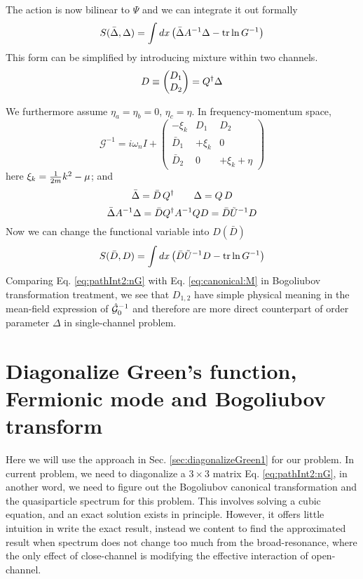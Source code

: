 The action is now bilinear to $\Psi$ and we can integrate it out formally
\begin{equation}
S(\bar\Delta,\Delta)=\int{dx}
	\left(\bar\Delta{}A^{-1}\Delta-\text{tr}\ln{G}^{-1}\right)
\end{equation}
This form can be simplified by introducing mixture within two channels.
\begin{equation}\label{eq:pathInt2:Ddef}
D\equiv\begin{pmatrix}D_{1}\\D_{2}\end{pmatrix}=Q^{\dagger}\Delta
\end{equation}

We furthermore assume $\eta_{a}=\eta_{b}=0$, $\eta_{c}=\eta$. In frequency-momentum space, 
\begin{equation}\label{eq:pathInt2:nG}
\mathcal{G}^{-1}=i\omega_{n}I+
\begin{pmatrix}
-\xi_{k}&D_{1}&D_{2}\\
\bar{D}_{1}&+\xi_{k}&0\\
\bar{D}_{2}&0&+\xi_{k}+\eta
\end{pmatrix}
\end{equation}
here $\xi_{k}=\frac{1}{2m}k^{2}-\mu$; and 
\begin{equation*}
\bar\Delta=\bar{D}\,Q^{\dagger}\qquad\Delta=Q\,D
\end{equation*}
\[
\bar\Delta{}A^{-1}\Delta=\bar{D}Q^{\dagger}A^{-1}QD=\bar{D}\tilde{U}^{-1}D
\]
Now we can change the functional variable into $D(\bar{D})$ 
\begin{equation}\label{eq:pathInt2:actionD}
S(\bar{D},D)=\int{dx}\left(\bar{D}\tilde{U}^{-1}D-\text{tr}\ln{G}^{-1}\right)
\end{equation}
Comparing Eq. \ref{eq:pathInt2:nG} with Eq. \ref{eq:canonical:M} in Bogoliubov transformation treatment, we  see that $D_{1,2}$ have simple physical meaning in the mean-field expression of $\hat{\mathcal{G}}^{-1}_{0}$ and therefore are more  direct counterpart of order parameter $\Delta$ in single-channel problem. 



\section{Diagonalize Green's function, Fermionic mode and Bogoliubov transform\label{sec:diagonalGreen}}
Here we will use the approach in Sec. \ref{sec:diagonalizeGreen1} for our problem.  In current problem, we need to diagonalize a $3\times3$ matrix Eq. \ref{eq:pathInt2:nG}, in another word, we need to figure out the Bogoliubov canonical transformation and the quasiparticle spectrum for this problem.   This involves solving a cubic equation, and an exact solution exists in principle.  However,  it offers little intuition in write the exact result, instead we content to find the approximated result when spectrum does not change too much from the broad-resonance, where the only effect of close-channel is modifying the effective interaction of open-channel. 


